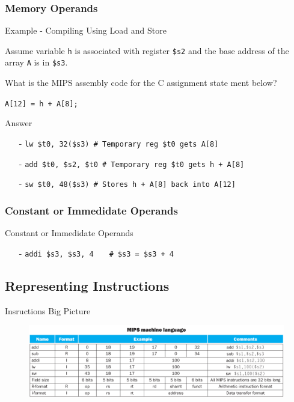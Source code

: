 \subsubsection{Memory Operands}
\begin{frame}{Example - Compiling Using Load and Store}
\begin{flushleft}
Assume variable \texttt{h} is associated with register \texttt{\$s2} and the base address of the array \texttt{A} is in \texttt{\$s3}. 

What is the MIPS assembly code for the C assignment state­
ment below?

\hspace{8mm}\texttt{A[12] = h + A[8];}
\end{flushleft}
\end{frame}

\begin{frame}{Answer}
\begin{itemize}
\item[-]
\texttt{lw \$t0, 32(\$s3) \# Temporary reg \$t0 gets A[8]}

\item[-]
\texttt{add \$t0, \$s2, \$t0  \# Temporary reg \$t0 gets h + A[8]}

\item[-]
\texttt{sw \$t0, 48(\$s3)  \# Stores h + A[8] back into A[12]}
\end{itemize}    
\end{frame}

\subsubsection{Constant or Immedidate Operands}
\begin{frame}{Constant or Immedidate Operands}
\begin{itemize}
\item[-] \texttt{addi \$s3, \$s3, 4  $\, \, \, \, \,$ \# \$s3 = \$s3 + 4}
\end{itemize}
\end{frame}

\subsection{Representing Instructions}
\begin{frame}{Insructions Big Picture}
\begin{figure}
\begin{center}
\includegraphics[width=\textwidth, height=0.55\textheight]{docs/images/instructions}
\end{center}
\end{figure}
\end{frame}

